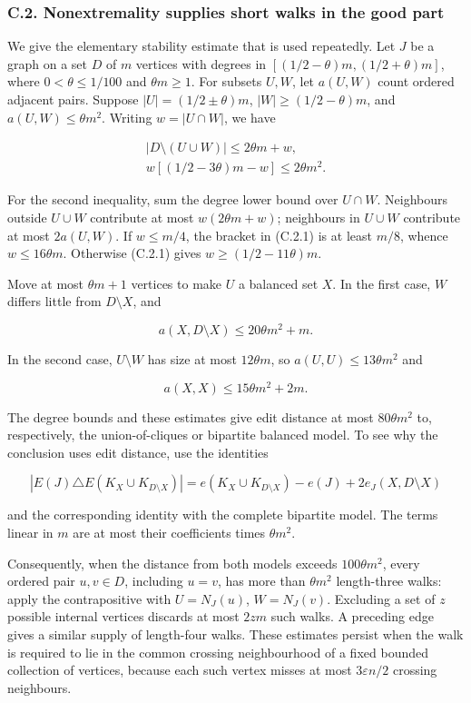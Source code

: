\documentclass[english,11pt,a4paper]{article}
\newcounter{none}
\begin{document}
\subsubsection{C.2. Nonextremality supplies short walks in the good part}\label{c.2.-nonextremality-supplies-short-walks-in-the-good-part}

We give the elementary stability estimate that is used repeatedly. Let \(J\) be a graph on a set \(D\) of \(m\) vertices with degrees in \([(1/2-\theta)m,(1/2+\theta)m]\), where \(0<\theta\le1/100\) and \(\theta m\ge1\). For subsets \(U,W\), let \(a(U,W)\) count ordered adjacent pairs. Suppose \(|U|=(1/2\pm\theta)m\), \(|W|\ge(1/2-\theta)m\), and \(a(U,W)\le\theta m^2\). Writing \(w=|U\cap W|\), we have

\[\begin{gathered}
|D\setminus(U\cup W)|\le2\theta m+w,
\\
w[(1/2-3\theta)m-w]\le2\theta m^2.
\end{gathered}
\tag{C.2.1}\]

For the second inequality, sum the degree lower bound over \(U\cap W\). Neighbours outside \(U\cup W\) contribute at most \(w(2\theta m+w)\); neighbours in \(U\cup W\) contribute at most \(2a(U,W)\). If \(w\le m/4\), the bracket in (C.2.1) is at least \(m/8\), whence \(w\le16\theta m\). Otherwise (C.2.1) gives \(w\ge(1/2-11\theta)m\).

Move at most \(\theta m+1\) vertices to make \(U\) a balanced set \(X\). In the first case, \(W\) differs little from \(D\setminus X\), and

\[a(X,D\setminus X)\le20\theta m^2+m.\]

In the second case, \(U\setminus W\) has size at most \(12\theta m\), so \(a(U,U)\le13\theta m^2\) and

\[a(X,X)\le15\theta m^2+2m.\]

The degree bounds and these estimates give edit distance at most \(80\theta m^2\) to, respectively, the union-of-cliques or bipartite balanced model. To see why the conclusion uses edit distance, use the identities

\[|E(J)\triangle E(K_X\cup K_{D\setminus X})|
=e(K_X\cup K_{D\setminus X})-e(J)+2e_J(X,D\setminus X)\]

and the corresponding identity with the complete bipartite model. The terms linear in \(m\) are at most their coefficients times \(\theta m^2\).

Consequently, when the distance from both models exceeds \(100\theta m^2\), every ordered pair \(u,v\in D\), including \(u=v\), has more than \(\theta m^2\) length-three walks: apply the contrapositive with \(U=N_J(u)\), \(W=N_J(v)\). Excluding a set of \(z\) possible internal vertices discards at most \(2zm\) such walks. A preceding edge gives a similar supply of length-four walks. These estimates persist when the walk is required to lie in the common crossing neighbourhood of a fixed bounded collection of vertices, because each such vertex misses at most \(3\varepsilon n/2\) crossing neighbours.
\end{document}
